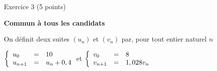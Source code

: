
\begin{h2}Exercice 3 (5 points)\end{h2}
\textbf{Commun à tous les candidats}
\par
\medbreak
\par
On définit deux suites $\left(u_n\right)$ et $\left(v_n\right)$ par, pour tout entier naturel $n$
\begin{center}
     $\left\{\begin{array}{l c l}
               u_0 &=& 10\\
               u_{n+1}& =& u_n + 0,4
               \end{array}\right.$\quad  et \quad $ \left\{\begin{array}{l c l} v_0 &=& 8\\
     v_{n+1}& =& 1,028v_n\end{array}\right.$
\end{center}
